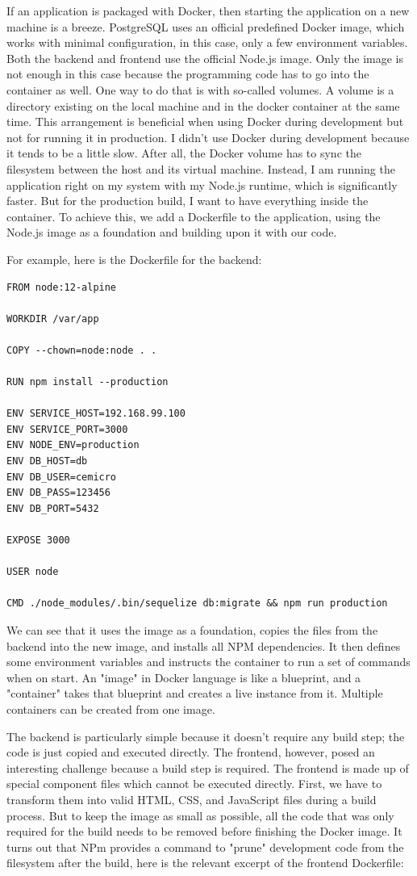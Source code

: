 If an application is packaged with Docker, then starting the application on a new machine is a breeze. PostgreSQL uses an official predefined Docker image, which works with minimal configuration, in this case, only a few environment variables. Both the backend and frontend use the official Node.js image. Only the image is not enough in this case because the programming code has to go into the container as well. One way to do that is with so-called volumes. A volume is a directory existing on the local machine and in the docker container at the same time. This arrangement is beneficial when using Docker during development but not for running it in production. I didn't use Docker during development because it tends to be a little slow. After all, the Docker volume has to sync the filesystem between the host and its virtual machine. Instead, I am running the application right on my system with my Node.js runtime, which is significantly faster. But for the production build, I want to have everything inside the container. To achieve this, we add a Dockerfile to the application, using the Node.js image as a foundation and building upon it with our code.

For example, here is the Dockerfile for the backend:

\begin{lstlisting}[belowskip=-1]
FROM node:12-alpine

WORKDIR /var/app

COPY --chown=node:node . .

RUN npm install --production

ENV SERVICE_HOST=192.168.99.100
ENV SERVICE_PORT=3000
ENV NODE_ENV=production
ENV DB_HOST=db
ENV DB_USER=cemicro
ENV DB_PASS=123456
ENV DB_PORT=5432

EXPOSE 3000

USER node

CMD ./node_modules/.bin/sequelize db:migrate && npm run production
\end{lstlisting}

We can see that it uses the  image as a foundation, copies the files from the backend into the new image, and installs all NPM dependencies. It then defines some environment variables and instructs the container to run a set of commands when on start. An "image" in Docker language is like a blueprint, and a "container" takes that blueprint and creates a live instance from it. Multiple containers can be created from one image.

The backend is particularly simple because it doesn't require any build step; the code is just copied and executed directly. The frontend, however, posed an interesting challenge because a build step is required. The frontend is made up of special  component files which cannot be executed directly. First, we have to transform them into valid HTML, CSS, and JavaScript files during a build process. But to keep the image as small as possible, all the code that was only required for the build needs to be removed before finishing the Docker image. It turns out that NPm provides a command to "prune" development code from the filesystem after the build, here is the relevant excerpt of the frontend Dockerfile:


